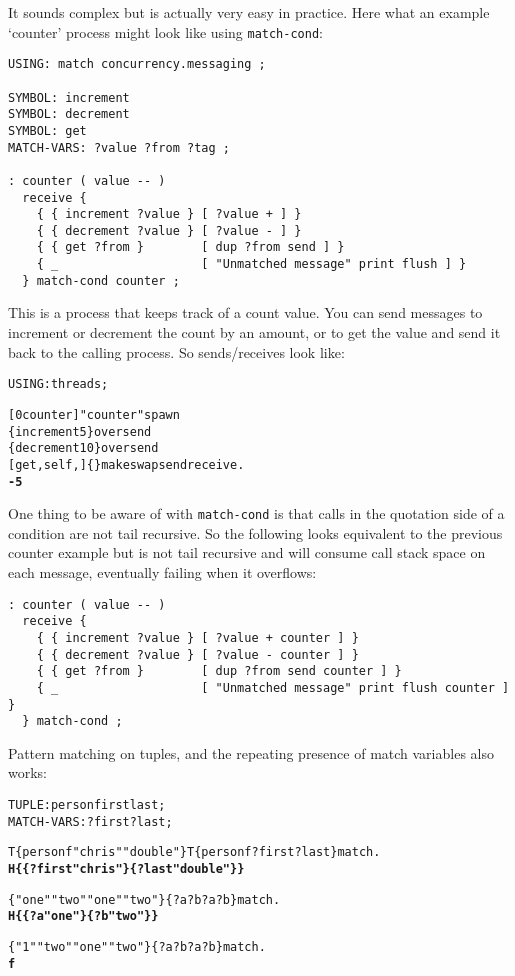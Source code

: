 
It sounds complex but is actually very easy in practice. Here what an
example `counter' process might look like using \verb|match-cond|:

\begin{verbatim}
USING: match concurrency.messaging ;

SYMBOL: increment
SYMBOL: decrement
SYMBOL: get
MATCH-VARS: ?value ?from ?tag ;

: counter ( value -- )
  receive {
    { { increment ?value } [ ?value + ] }
    { { decrement ?value } [ ?value - ] }
    { { get ?from }        [ dup ?from send ] }
    { _                    [ "Unmatched message" print flush ] }
  } match-cond counter ;
\end{verbatim}

This is a process that keeps track of a count value. You can send
messages to increment or decrement the count by an amount, or to get
the value and send it back to the calling process. So sends/receives
look like:

\begin{alltt}
USING: threads ;

[ 0 counter ] "counter" spawn
\{ increment 5 \} over send
\{ decrement 10 \} over send
[ get , self , ] \{ \} make swap send receive .
  \textbf{-5}
\end{alltt}

One thing to be aware of with \verb|match-cond| is that calls in the
quotation side of a condition are not tail recursive. So the following
looks equivalent to the previous counter example but is not tail
recursive and will consume call stack space on each message,
eventually failing when it overflows:

\begin{verbatim}
: counter ( value -- )
  receive {
    { { increment ?value } [ ?value + counter ] }
    { { decrement ?value } [ ?value - counter ] }
    { { get ?from }        [ dup ?from send counter ] }
    { _                    [ "Unmatched message" print flush counter ] }
  } match-cond ;
\end{verbatim}

Pattern matching on tuples, and the repeating presence of match
variables also works:

\begin{alltt}
TUPLE: person first last ;
MATCH-VARS: ?first ?last ;

T\{ person f "chris" "double" \} T\{ person f ?first ?last \} match .
  \textbf{H\{ \{ ?first "chris" \} \{ ?last "double" \} \}}

\{ "one" "two" "one" "two" \} \{ ?a ?b ?a ?b \} match .
  \textbf{H\{ \{ ?a "one" \} \{ ?b "two" \} \}}

\{ "1" "two" "one" "two" \} \{ ?a ?b ?a ?b \} match .
  \textbf{f}
\end{alltt}
